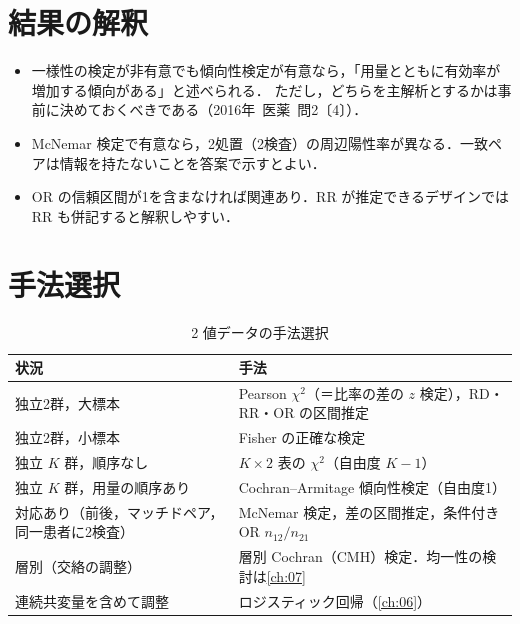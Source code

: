 \documentclass[a4paper,11pt,openany]{ltjsbook}
\newcommand{\kakomon}[2]{\mbox{#1年 医薬 問#2}}
\begin{document}
\section{結果の解釈}\label{sec:04-interp}
\begin{itemize}
\item 一様性の検定が非有意でも傾向性検定が有意なら，「用量とともに有効率が増加する傾向がある」と述べられる．
      ただし，どちらを主解析とするかは事前に決めておくべきである（\kakomon{2016}{2}〔4〕）．
\item McNemar 検定で有意なら，2処置（2検査）の周辺陽性率が異なる．一致ペアは情報を持たないことを答案で示すとよい．
\item OR の信頼区間が1を含まなければ関連あり．RR が推定できるデザインでは RR も併記すると解釈しやすい．
\end{itemize}

\section{手法選択}\label{sec:04-choice}
\begin{table}[htbp]
\centering\small
\caption{2 値データの手法選択}\label{tab:04-choice}
\begin{tabular}{@{}L{55mm}L{85mm}@{}}
\toprule
状況 & 手法\\
\midrule
独立2群，大標本 & Pearson $\chi^2$（＝比率の差の $z$ 検定），RD・RR・OR の区間推定\\
独立2群，小標本 & Fisher の正確な検定\\
独立 $K$ 群，順序なし & $K\times2$ 表の $\chi^2$（自由度 $K-1$）\\
独立 $K$ 群，用量の順序あり & Cochran--Armitage 傾向性検定（自由度1）\\
対応あり（前後，マッチドペア，同一患者に2検査） & McNemar 検定，差の区間推定，条件付きOR $n_{12}/n_{21}$\\
層別（交絡の調整） & 層別 Cochran（CMH）検定．均一性の検討は\cref{ch:07}\\
連続共変量を含めて調整 & ロジスティック回帰（\cref{ch:06}）\\
\bottomrule
\end{tabular}
\end{table}
\end{document}
